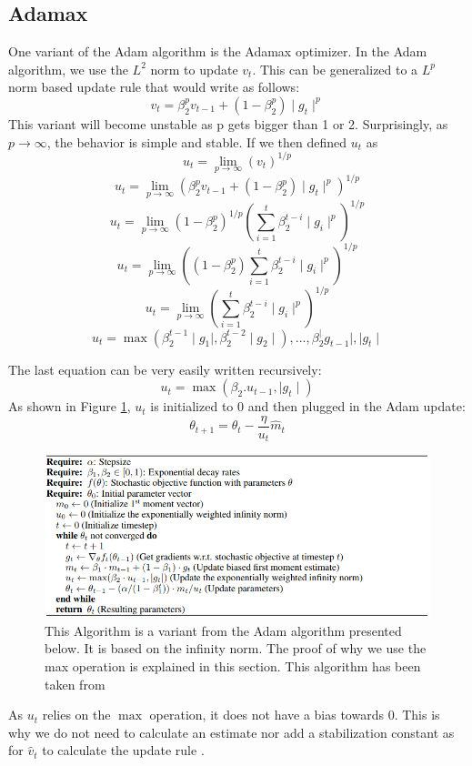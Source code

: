 \subsection{Adamax}
One variant of the Adam algorithm is the Adamax optimizer. In the Adam algorithm, we use the \(L^2\) norm to update \(v_t\). This can be generalized to a \(L^p\) norm based update rule that would write as follows: \[ v_t = \beta_2^p v_{t-1} + (1 - \beta_2^p) \mid g_t\mid^p \] This variant will become unstable as p gets bigger than 1 or 2. Surprisingly, as \(p\to\infty\), the behavior is simple and stable. If we then defined \(u_t\) as \[u_t = \lim_{p\to\infty}(v_t)^{1/p}\]
\[u_t = \lim_{p\to\infty}(\beta_2^p v_{t-1} + (1 - \beta_2^p)\mid g_t\mid^p)^{1/p}\] 
\[u_t = \lim_{p\to\infty}(1 - \beta_2^p)^{1/p}(\sum_{i=1}^{t}\beta_2^{t-i} \mid g_i\mid ^p)^{1/p}\]
\[u_t = \lim_{p\to\infty}((1 - \beta_2^p) \sum_{i=1}^{t}\beta_2^{t-i} \mid g_i\mid ^p)^{1/p}\]
\[u_t = \lim_{p\to\infty}(\sum_{i=1}^{t}\beta_2^{t-i} \mid g_i\mid ^p)^{1/p}\]
\[u_t = \max (\beta_2^{t-1}  \mid g_1\mid, \beta_2^{t-2}  \mid g_2\mid ), ..., \beta_2^ \mid g_{t-1}\mid, \mid g_t\mid\]

The last equation can be very easily written recursively: 
\[ u_t = \max(\beta_2 . u_{t-1},  \mid g_t\mid)\]
As shown in Figure \ref{fig:adamax_algo}, \(u_t\) is initialized to 0 and then plugged in the Adam update: 
\[\theta_{t+1} = \theta_t - \frac{\eta}{u_t} \hat{m}_t\]

\begin{figure}[!htp]
    \centering
        \includegraphics[width=1\textwidth]{figures/02-adamax_algo}
        \caption[Adamax Algorithm]{ This Algorithm is a variant from the Adam algorithm presented below. It is based on the infinity norm. The proof of why we use the max operation is explained in this section. This algorithm has been taken from \cite{adam}}\label{fig:adamax_algo}
\end{figure}

As \(u_t\) relies on the \(\max\) operation, it does not have a bias towards 0. This is why we do not need to calculate an estimate nor add a stabilization constant as for \(\hat{v}_t\) to calculate the update rule \cite{adam}.

